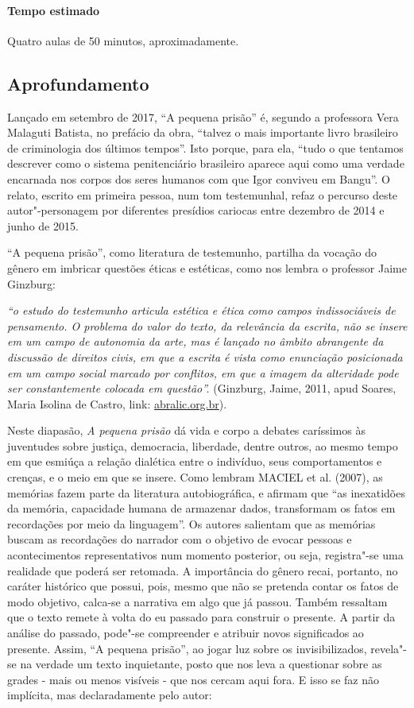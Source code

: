\documentclass[11pt]{extarticle}
\begin{document}
\paragraph{Tempo estimado} Quatro aulas de 50 minutos, aproximadamente.


\subsection{Aprofundamento}

Lançado em setembro de 2017, ``A pequena prisão'' é, segundo a
professora Vera Malaguti Batista, no prefácio da obra, ``talvez o mais
importante livro brasileiro de criminologia dos últimos tempos''. Isto
porque, para ela, ``tudo o que tentamos descrever como o sistema
penitenciário brasileiro aparece aqui como uma verdade encarnada nos
corpos dos seres humanos com que Igor conviveu em Bangu''. O relato,
escrito em primeira pessoa, num tom testemunhal, refaz o percurso deste
autor"-personagem por diferentes presídios cariocas entre dezembro de
2014 e junho de 2015.

``A pequena prisão'', como literatura de testemunho, partilha da vocação
do gênero em imbricar questões éticas e estéticas, como nos lembra o
professor Jaime Ginzburg:

\emph{``o estudo do testemunho articula estética e ética como campos
indissociáveis de pensamento. O problema do valor do texto, da
relevância da escrita, não se insere em um campo de autonomia da arte,
mas é lançado no âmbito abrangente da discussão de direitos civis, em
que a escrita é vista como enunciação posicionada em um campo social
marcado por conflitos, em que a imagem da alteridade pode ser
constantemente colocada em questão''.} (Ginzburg, Jaime, 2011, apud
Soares, Maria Isolina de Castro, link:
\href{https://abralic.org.br/anais/arquivos/2018\_1547730007.pdf}{abralic.org.br}).

Neste diapasão, \emph{A pequena prisão} dá vida e corpo a debates
caríssimos às juventudes sobre justiça, democracia, liberdade, dentre
outros, ao mesmo tempo em que esmiúça a relação dialética entre o
indivíduo, seus comportamentos e crenças, e o meio em que se insere.
Como lembram MACIEL et al. (2007), as memórias fazem parte da literatura
autobiográfica, e afirmam que ``as inexatidões da memória, capacidade
humana de armazenar dados, transformam os fatos em recordações por meio
da linguagem''. Os autores salientam que as memórias buscam as
recordações do narrador com o objetivo de evocar pessoas e
acontecimentos representativos num momento posterior, ou seja,
registra"-se uma realidade que poderá ser retomada. A importância do
gênero recai, portanto, no caráter histórico que possui, pois, mesmo que
não se pretenda contar os fatos de modo objetivo, calca-se a narrativa
em algo que já passou. Também ressaltam que o texto remete à volta do eu
passado para construir o presente. A partir da análise do passado,
pode"-se compreender e atribuir novos significados ao presente. Assim,
``A pequena prisão'', ao jogar luz sobre os invisibilizados, revela"-se
na verdade um texto inquietante, posto que nos leva a questionar sobre as
grades - mais ou menos visíveis - que nos cercam aqui fora. E isso se
faz não implícita, mas declaradamente pelo autor:
\end{document}
